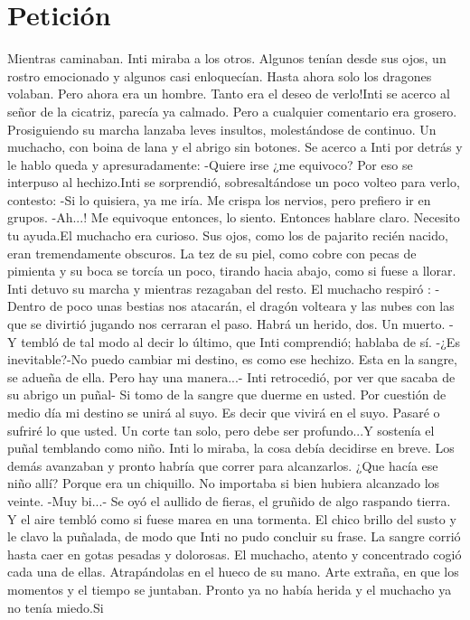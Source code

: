 \chapter{Petición}
Mientras caminaban. Inti miraba a los otros. Algunos tenían desde sus ojos, un rostro emocionado y algunos casi enloquecían.  Hasta ahora solo los dragones volaban. Pero ahora era un hombre. Tanto era el deseo de verlo!Inti se acerco al señor de la cicatriz, parecía ya calmado. Pero a cualquier comentario era grosero. Prosiguiendo su marcha lanzaba leves insultos, molestándose de continuo. Un muchacho, con boina de lana y el abrigo sin botones. Se acerco a Inti por detrás y le hablo queda y apresuradamente: -Quiere irse ¿me equivoco? Por eso se interpuso al hechizo.Inti se sorprendió, sobresaltándose un poco volteo para verlo, contesto: -Si lo quisiera, ya me iría. Me crispa los nervios, pero prefiero ir en grupos. -Ah...! Me equivoque entonces, lo siento. Entonces hablare claro. Necesito tu ayuda.El muchacho era curioso. Sus ojos, como los de pajarito recién nacido, eran tremendamente obscuros. La tez de su piel, como cobre con pecas de pimienta y su boca se torcía un poco, tirando hacia abajo, como si fuese a llorar. Inti detuvo su marcha y mientras rezagaban del resto. El muchacho respiró : - Dentro de poco unas bestias nos atacarán, el dragón volteara y las nubes con las que se divirtió jugando nos cerraran el paso. Habrá un herido, dos. Un muerto. - Y tembló de tal modo al decir lo último, que Inti comprendió; hablaba de sí. -¿Es inevitable?-No puedo cambiar mi destino, es como ese hechizo. Esta en la sangre, se adueña de ella. Pero hay una manera...-  Inti retrocedió, por ver que sacaba de su abrigo un puñal- Si tomo de la sangre que duerme en usted. Por cuestión de medio día mi destino se unirá al suyo. Es decir que vivirá en el suyo. Pasaré o sufriré lo que usted. Un corte tan solo, pero debe ser profundo...Y sostenía el puñal temblando como niño. Inti lo miraba, la cosa debía decidirse en breve. Los demás avanzaban y pronto habría que correr para alcanzarlos. ¿Que hacía ese niño allí? Porque era un chiquillo. No importaba si bien hubiera alcanzado los veinte. -Muy bi...- Se oyó el aullido de fieras, el gruñido de algo raspando tierra. Y el aire tembló como si fuese marea en una tormenta. El chico brillo del susto y le clavo la puñalada, de modo que Inti no pudo concluir su frase. La sangre corrió hasta caer en gotas pesadas y dolorosas. El muchacho, atento y concentrado cogió cada una de ellas. Atrapándolas en el hueco de su mano. Arte extraña, en que los momentos y el tiempo se juntaban. Pronto ya no había herida y el muchacho ya no tenía miedo.Si

